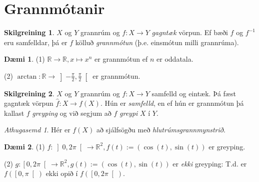 \documentclass[a4paper,icelandic]{book}
\theoremstyle{definition}
\newtheorem{skilgr}{Skilgreining}[section]
\newtheorem{daemi}{Dæmi}[section]
\theoremstyle{plain}
\theoremstyle{remark}
\newtheorem*{ath}{Athugasemd}
\newcommand{\R}{\mathbb{R}} %
\begin{document}
\section{Grannmótanir}
\begin{skilgr}
  $X$ og $Y$ grannrúm og $f:X\to Y$ \emph{gagntæk} vörpun. Ef bæði $f$ og
  $f^{-1}$ eru samfelldar, þá er $f$ kölluð \emph{grannmótun}
  (þ.e. einsmótun milli grannrúma).
\end{skilgr}
\begin{daemi}
  (1) $\R\to\R,x\mapsto x^n$ er grannmótun ef $n$ er oddatala.

  (2) $\arctan:\R\to\left]-\frac\pi 2, \frac\pi 2\right[$ er grannmótun.
\end{daemi}
\begin{skilgr}
  $X$ og $Y$ grannrúm og $f:X\to Y$ samfelld og eintæk. Þá fæst gagntæk vörpun
  $\hat f:X\to f(X)$. Hún er \emph{samfelld}, en ef hún er grannmótun þá kallast
  $f$ \emph{greyping} og við segjum að $f$ \emph{greypi}
  $X$ í $Y$.
\end{skilgr}
\begin{ath}
  Hér er $f(X)$ að sjálfsögðu með \emph{hlutrúmsgrannmynstrið}.
\end{ath}
\begin{daemi}
  (1) $f:\left]0,2\pi\right[\to\R^2, f(t):=(\cos(t),\sin(t))$ er greyping.

  (2) $g:\left[0,2\pi\right[\to\R^2, g(t):=(\cos(t),\sin(t))$ er \emph{ekki}
  greyping: T.d. er $f\left( \left[ 0,\pi \right[ \right)$ ekki opið í
  $f\left( \left[ 0,2\pi \right[ \right)$.
\end{daemi}
\end{document}
